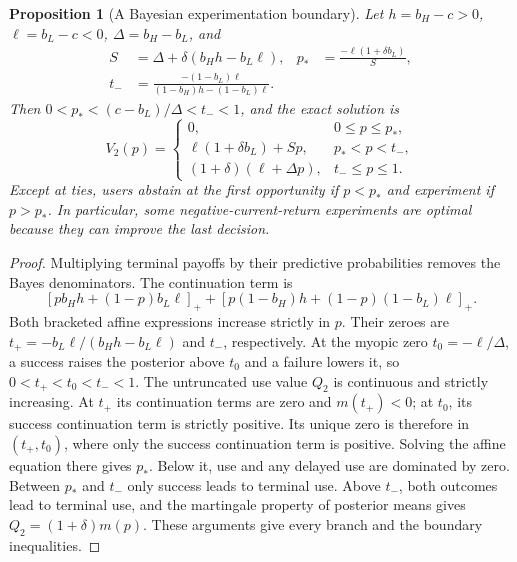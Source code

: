 \documentclass[11pt]{article}
\newtheorem{proposition}{Proposition}
\begin{document}
\begin{proposition}[A Bayesian experimentation boundary]\label{prop:bayes}
Let $h=b_H-c>0$, $\ell=b_L-c<0$, $\Delta=b_H-b_L$, and
\begin{align}
 S&=\Delta+\delta(b_Hh-b_L\ell),&
 p_*&=\frac{-\ell(1+\delta b_L)}{S},\\
 t_-&=\frac{-(1-b_L)\ell}{(1-b_H)h-(1-b_L)\ell}.
\end{align}
Then $0<p_*< (c-b_L)/\Delta<t_-<1$, and the exact solution is
\begin{equation}
 V_2(p)=\begin{cases}
 0,&0\leq p\leq p_*,\\
 \ell(1+\delta b_L)+Sp,&p_*<p<t_-,\\
 (1+\delta)(\ell+\Delta p),&t_-\leq p\leq1.
 \end{cases}\label{eq:piecewise}
\end{equation}
Except at ties, users abstain at the first opportunity if $p<p_*$ and experiment if $p>p_*$. In particular, some negative-current-return experiments are optimal because they can improve the last decision.
\end{proposition}
\begin{proof}
Multiplying terminal payoffs by their predictive probabilities removes the Bayes denominators. The continuation term is
\[
 [pb_Hh+(1-p)b_L\ell]_+
 +[p(1-b_H)h+(1-p)(1-b_L)\ell]_+.
\]
Both bracketed affine expressions increase strictly in $p$. Their zeroes are $t_+=-b_L\ell/(b_Hh-b_L\ell)$ and $t_-$, respectively. At the myopic zero $t_0=-\ell/\Delta$, a success raises the posterior above $t_0$ and a failure lowers it, so $0<t_+<t_0<t_-<1$. The untruncated use value $Q_2$ is continuous and strictly increasing. At $t_+$ its continuation terms are zero and $m(t_+)<0$; at $t_0$, its success continuation term is strictly positive. Its unique zero is therefore in $(t_+,t_0)$, where only the success continuation term is positive. Solving the affine equation there gives $p_*$. Below it, use and any delayed use are dominated by zero. Between $p_*$ and $t_-$ only success leads to terminal use. Above $t_-$, both outcomes lead to terminal use, and the martingale property of posterior means gives $Q_2=(1+\delta)m(p)$. These arguments give every branch and the boundary inequalities.
\end{proof}
\end{document}
